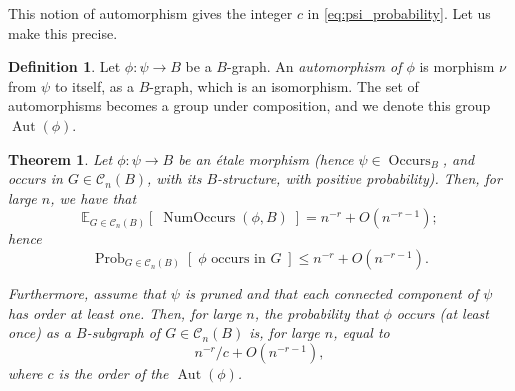 \documentclass{memo-l}
\theoremstyle{plain}
\theoremstyle{definition}
\newtheorem{definition}[theorem]{Definition}
\numberwithin{section}{chapter}
\numberwithin{equation}{chapter}
\newcommand{\prob}[2]{{\Prob}_{#1}{\left[\; #2\; \right]}}
\newcommand{\expect}[2]{{\mathbb{E}}_{#1}{\left[\; #2\; \right]}}
\DeclareMathOperator{\Prob}{Prob}
\DeclareMathOperator{\Occurs}{Occurs}
\DeclareMathOperator{\Aut}{Aut}
\DeclareMathOperator{\NumOccurs}{NumOccurs}
\newcommand{\from}{\colon}
\theoremstyle{plain}
\newtheorem{thm}[theorem]{Theorem}
\theoremstyle{definition}
\newcommand\cC{\mathcal{C}}
\begin{document}
This notion of automorphism gives the integer $c$ in 
\eqref{eq:psi_probability}.  Let us make this precise.

\begin{definition} Let $\phi\from\psi\to B$ be a $B$-graph.  An
{\em automorphism of $\phi$} is morphism $\nu$ from $\psi$ to itself,
as a $B$-graph, which is an isomorphism.
The set of automorphisms becomes a group under composition, and we 
denote this group $\Aut(\phi)$.
\end{definition}

% 


\begin{thm}\label{thm:prob_tangle}
\label{th:prob_occurs}
Let $\phi\from\psi\to B$ be an \'etale morphism (hence $\psi\in \Occurs_B$,
and occurs in $G\in\cC_n(B)$, with its $B$-structure, with positive
probability).
Then, for large $n$, we have that 
\begin{equation}\label{eq:psi_expectation}
\expect{G\in\cC_n(B)}{\NumOccurs(\phi,B)} =
n^{-r} + O(n^{-r-1});
\end{equation}
hence 
\begin{equation}\label{eq:psi_prob_no_assumptions}
\prob{G\in\cC_n(B)}{\mbox{$\phi$ occurs in $G$}} \le
n^{-r} + O(n^{-r-1}).
\end{equation}

Furthermore, assume that $\psi$ is pruned and that
each connected component of $\psi$
has order at least one.
Then, for large $n$, the probability that
$\phi$ occurs (at least once) as a $B$-subgraph of $G\in\cC_n(B)$
is, for large $n$, equal to
\begin{equation}\label{eq:actual_probability}
n^{-r}/c + O(n^{-r-1}),
\end{equation}
where $c$ is the order of the $\Aut(\phi)$.
\end{thm} 
\end{document}
